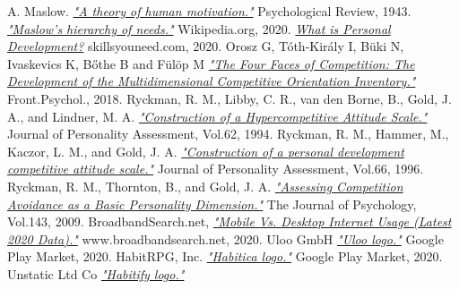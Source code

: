 \documentclass[twoside]{ctuthesis}
\begin{document}
    
    \begin{thebibliography}{99}
        A. Maslow.
        \href{http://psychclassics.yorku.ca/Maslow/motivation.htm}{\emph{"A theory of human motivation."}}
        Psychological Review, 1943.
        \href{https://en.wikipedia.org/wiki/File:Maslow's_Hierarchy_of_Needs2.svg}{\emph{"Maslow's hierarchy of needs."}}
        Wikipedia.org, 2020.
        \href{https://www.skillsyouneed.com/ps/personal-development.html}{\emph{What is Personal Development?}}
        skillsyouneed.com, 2020.
        Orosz G, Tóth-Király I, Büki N, Ivaskevics K, Bőthe B and Fülöp M
        \href{https://www.frontiersin.org/articles/10.3389/fpsyg.2018.00779/full}{\emph{"The Four Faces of Competition: The Development of the Multidimensional Competitive Orientation Inventory."}}
        Front.Psychol., 2018.
        Ryckman, R. M., Libby, C. R., van den Borne, B., Gold, J. A., and Lindner, M. A.
        \href{https://doi.org/10.1080/00223891.1990.9674097}{\emph{"Construction of a Hypercompetitive Attitude Scale."}}
        Journal of Personality Assessment, Vol.62, 1994.
        Ryckman, R. M., Hammer, M., Kaczor, L. M., and Gold, J. A.
        \href{https://doi.org/10.1207/s15327752jpa6602_15}{\emph{"Construction of a personal development competitive attitude scale."}}
        Journal of Personality Assessment, Vol.66, 1996.
         Ryckman, R. M., Thornton, B., and Gold, J. A.
        \href{https://doi.org/10.3200/JRLP.143.2.175-192}{\emph{"Assessing Competition Avoidance as a Basic Personality Dimension."}}
        The Journal of Psychology, Vol.143, 2009.
        BroadbandSearch.net,
        \href{https://www.broadbandsearch.net/blog/mobile-desktop-internet-usage-statistics}{\emph{"Mobile Vs. Desktop Internet Usage (Latest 2020 Data)."}}
        www.broadbandsearch.net, 2020.
        Uloo GmbH
        \href{https://play.google.com/store/apps/details?id=com.uloo}{\emph{"Uloo logo."}}
        Google Play Market, 2020.
         HabitRPG, Inc.
        \href{https://play.google.com/store/apps/details?id=com.habitrpg.android.habitica}{\emph{"Habitica logo."}}
        Google Play Market, 2020.
        Unstatic Ltd Co
        \href{https://play.google.com/store/apps/details?id=co.unstatic.habitify}{\emph{"Habitify logo."}}

\end{thebibliography}
\end{document}
